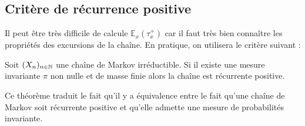 \subsection{Critère de récurrence positive}

Il peut être très difficile de calcule $ \mathbb{E}_x( \tau_x^+)$ car il faut très bien connaître 
les propriétés des excursions de la chaîne. En pratique, on utilisera le critère suivant : 

\begin{theorem}[Réciproque]
    Soit $(X_n)_{n \in \mathbb{N}}$ une chaîne de Markov irréductible. Si il existe une mesure invariante $ \pi$ non nulle 
    et de masse finie alors la chaîne est récurrente positive. 
\end{theorem}

Ce théorème traduit le fait qu'il y a équivalence entre le fait qu'une chaîne de Markov soit récurrente positive et 
qu'elle admette une mesure de probabilités invariante. 

